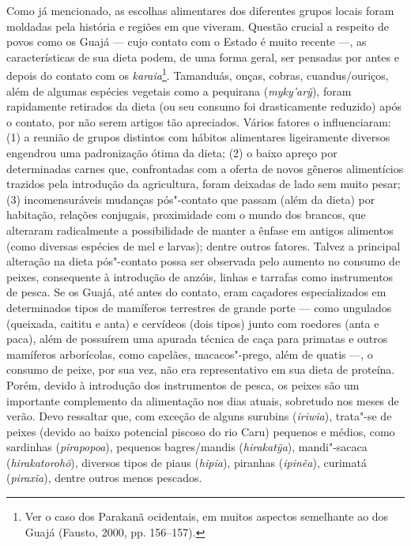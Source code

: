 Como já mencionado, as escolhas alimentares dos diferentes grupos locais
foram moldadas pela história e regiões em que viveram. Questão crucial a
respeito de povos como os Guajá --- cujo contato com o Estado é muito
recente ---, as características de sua dieta podem, de uma forma geral,
ser pensadas por antes e depois do contato com os
\emph{karaia}\footnote{Ver o caso dos Parakanã ocidentais, em muitos
  aspectos semelhante ao dos Guajá (Fausto, 2000, pp. 156--157).}. Tamanduás,
onças, cobras, cuandus/ouriços, além de algumas espécies vegetais como a
pequirana (\emph{myky'arỹ}), foram rapidamente retirados da dieta (ou
seu consumo foi drasticamente reduzido) após o contato, por não serem
artigos tão apreciados. Vários fatores o influenciaram: (1) a reunião de
grupos distintos com hábitos alimentares ligeiramente diversos engendrou
uma padronização ótima da dieta; (2) o baixo apreço por determinadas
carnes que, confrontadas com a oferta de novos gêneros alimentícios
trazidos pela introdução da agricultura, foram deixadas de lado sem
muito pesar; (3) incomensuráveis mudanças pós"-contato que passam (além
da dieta) por habitação, relações conjugais, proximidade com o mundo dos
brancos, que alteraram radicalmente a possibilidade de manter a ênfase
em antigos alimentos (como diversas espécies de mel e larvas); dentre
outros fatores. Talvez a principal alteração na dieta pós"-contato possa
ser observada pelo aumento no consumo de peixes, consequente à
introdução de anzóis, linhas e tarrafas como instrumentos de pesca. Se
os Guajá, até antes do contato, eram caçadores especializados em
determinados tipos de mamíferos terrestres de grande porte --- como
ungulados (queixada, caititu e anta) e cervídeos (dois tipos) junto com
roedores (anta e paca), além de possuírem uma apurada técnica de caça
para primatas e outros mamíferos arborícolas, como capelães,
macacos"-prego, além de quatis ---, o consumo de peixe, por sua vez, não
era representativo em sua dieta de proteína. Porém, devido à introdução
dos instrumentos de pesca, os peixes são um importante complemento da
alimentação nos dias atuais, sobretudo nos meses de verão. Devo
ressaltar que, com exceção de alguns surubins (\emph{iriwia}), trata"-se
de peixes (devido ao baixo potencial piscoso do rio Caru) pequenos e
médios, como sardinhas (\emph{pirapopoa}), pequenos bagres/mandis
(\emph{hirakatỹa}), mandi"-sacaca (\emph{hirakatorohõ}), diversos tipos
de piaus (\emph{hipia}), piranhas (\emph{ipinẽa}), curimatá
(\emph{piraxĩa}), dentre outros menos pescados.


